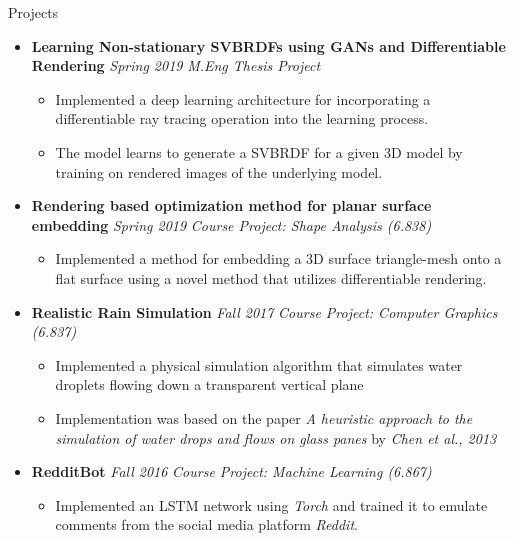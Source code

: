 \documentclass[10pt]{article}
\begin{document}
\begin{area}{Projects}
\begin{itemize}
    \item
        \textbf{Learning Non-stationary SVBRDFs using GANs and Differentiable Rendering} \hfill \emph{Spring 2019} \linebreak
        \emph{M.Eng Thesis Project}
        \begin{itemize}
            \item Implemented a deep learning architecture for incorporating a differentiable ray tracing operation into the learning process.
            \item The model learns to generate a SVBRDF for a given 3D model by training on rendered images of the underlying model.
        \end{itemize}
    \item
        \textbf{Rendering based optimization method for planar surface embedding} \hfill \emph{Spring 2019} \linebreak
        \emph{Course Project: Shape Analysis (6.838)}
        \begin{itemize}
            \item Implemented a method for embedding a 3D surface triangle-mesh onto a flat surface using a novel method that utilizes differentiable rendering.
        \end{itemize}
    \item
        \textbf{Realistic Rain Simulation} \hfill \emph{Fall 2017} \linebreak
        \emph{Course Project: Computer Graphics (6.837)}
        \begin{itemize}
            \item Implemented a physical simulation algorithm that simulates water droplets flowing down a transparent vertical plane
            \item Implementation was based on the paper \emph{A heuristic approach to the simulation of water drops and flows on glass panes} by \emph{Chen et al., 2013} 
        \end{itemize}
    \item
        \textbf{RedditBot} \hfill \emph{Fall 2016} \linebreak
        \emph{Course Project: Machine Learning (6.867)}
        \begin{itemize}
            \item Implemented an LSTM network using \emph{Torch} and trained it to emulate comments from the social media platform \emph{Reddit}.
        \end{itemize}
\end{itemize}
\end{area}
\end{document}
